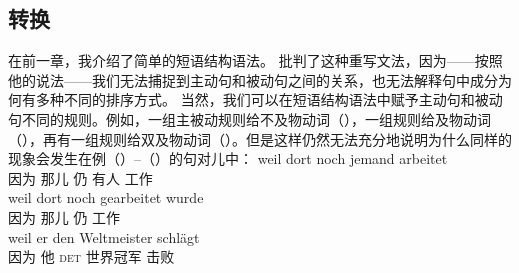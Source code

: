 \subsection{转换}
\label{Abschnitt-Transformationen}

在前一章，我介绍了简单的短语结构语法。 \citet[\S~5]{Chomsky57a}批判了这种重写文法，因为——按照他的说法——我们无法捕捉到主动句和被动句之间的关系，也无法解释句中成分为何有多种不同的排序方式。
当然，我们可以在短语结构语法中赋予主动句和被动句不同的规则。例如，一组主被动规则给不及物动词（），一组规则给及物动词（），再有一组规则给双及物动词（）。但是这样仍然无法充分地说明为什么同样的现象会发生在例（）--（）的句对儿中：
\eal
\label{ex-transformations-intr}
\ex 
\gll weil dort noch jemand arbeitet\\
     因为 那儿 仍 有人 工作\\
\ex 
\gll weil dort noch gearbeitet wurde\\
     因为 那儿 仍 工作 \passivepst{}\\
\zl
\eal
\ex 
\gll weil er den Weltmeister schlägt\\
	 因为 他 \textsc{det} 世界冠军 击败\\
